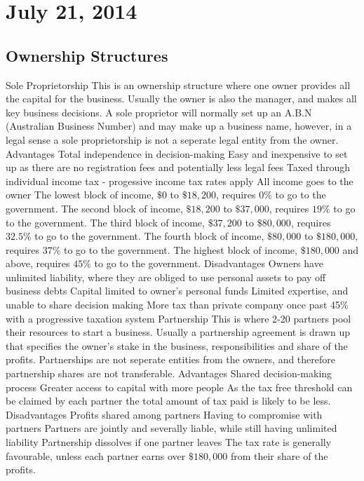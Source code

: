 \section{July 21, 2014}

\subsection{Ownership Structures}
\begin{outline}
\1 Sole Proprietorship
\2 This is an ownership structure where one owner provides all the capital for the business. Usually the owner is also the manager, and makes all key business decisions. A sole proprietor will normally set up an A.B.N (Australian Business Number) and may make up a business name, however, in a legal sense a sole proprietorship is not a seperate legal entity from the owner.
\2 Advantages
\3 Total independence in decision-making
\3 Easy and inexpensive to set up as there are no registration fees and potentially less legal fees
\3 Taxed through individual income tax - progessive income tax rates apply
\3 All income goes to the owner
\4 The lowest block of income, $\$0$ to $\$18,200$, requires $0\%$ to go to the government.
\4 The second block of income, $\$18,200$ to $\$37,000$, requires $19\%$ to go to the government.
\4 The third block of income, $\$37,200$ to $\$80,000$, requires $32.5\%$ to go to the government.
\4 The fourth block of income, $\$80,000$ to $\$180,000$, requires $37\%$ to go to the government.
\4 The highest block of income, $\$180,000$ and above, requires $45\%$ to go to the government.
\2 Disadvantages
\3 Owners have unlimited liability, where they are obliged to use personal assets to pay off business debts
\3 Capital limited to owner's personal funds
\3 Limited expertise, and unable to share decision making
\3 More tax than private company once past 45\% with a progressive taxation system
\1 Partnership
\2 This is where 2-20 partners pool their resources to start a business. Usually a partnership agreement is drawn up that specifies the owner's stake in the business, responsibilities and share of the profits. Partnerships are not seperate entities from the owners, and therefore partnership shares are not transferable.
\2 Advantages
\3 Shared decision-making process
\3 Greater access to capital with more people
\3 As the tax free threshold can be claimed by each partner the total amount of tax paid is likely to be less.
\2 Disadvantages
\3 Profits shared among partners
\3 Having to compromise with partners
\3 Partners are jointly and severally liable, while still having unlimited liability
\3 Partnership dissolves if one partner leaves
\3 The tax rate is generally favourable, unless each partner earns over $\$180,000$ from their share of the profits.
\end{outline}

